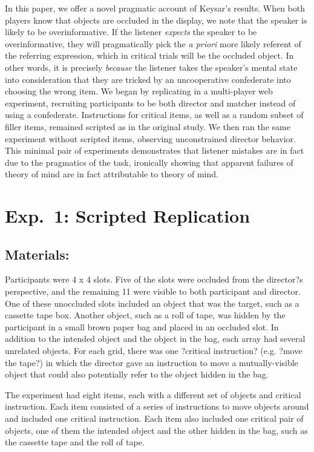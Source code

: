 \documentclass[10pt,letterpaper]{article}
\begin{document}
In this paper, we offer a novel pragmatic account of Keysar's results. When both players know that objects are occluded in the display, we note that the speaker is likely to be overinformative. If the listener \emph{expects} the speaker to be overinformative, they will pragmatically pick the \emph{a priori} more likely referent of the referring expression, which in critical trials will be the occluded object. In other words, it is precisely \emph{because} the listener takes the speaker's mental state into consideration that they are tricked by an uncooperative confederate into choosing the wrong item. We began by replicating  in a multi-player web experiment, recruiting participants to be both director and matcher instead of using a confederate. Instructions for critical items, as well as a random subset of filler items, remained scripted as in the original study. We then ran the same experiment without scripted items, observing unconstrained director behavior. This minimal pair of experiments demonstrates that listener mistakes are in fact due to the pragmatics of the task, ironically showing that apparent failures of theory of mind are in fact attributable to theory of mind.

\section{Exp.~1: Scripted Replication}
\label{sec:Exp1}

\subsection{Materials:}

Participants were  4 x 4 slots. Five of the slots were occluded from the director?s perspective, and the remaining 11 were visible to both participant and director. One of these unoccluded slots included an object that was the target, such as a cassette tape box. Another object, such as a roll of tape, was hidden by the participant in a small brown paper bag and placed in an occluded slot. In addition to the intended object and the object in the bag, each array had several unrelated objects. For each grid, there was one ?critical instruction? (e.g. ?move the tape?) in which the director gave an instruction to move a mutually-visible object that could also potentially refer to the object hidden in the bag.

The experiment had eight items, each with a different set of objects and critical instruction. Each item consisted of a series of instructions to move objects around and included one critical instruction. Each item also included one critical pair of objects, one of them the intended object and the other hidden in the bag, such as the cassette tape and the roll of tape.
\end{document}
